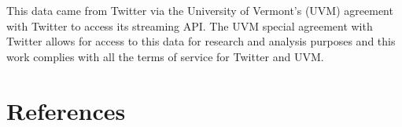 \documentclass[9pt,twocolumn,twoside,lineno]{pnas-new}
\begin{document}
This data came from Twitter via the University of Vermont’s (UVM) agreement with Twitter to access its streaming API. The UVM special agreement with Twitter allows for access to this data for research and analysis purposes and this work complies with all the terms of service for Twitter and UVM. 

\section*{References}

% 
% 
% 
% 
% 
% 
\end{document}
